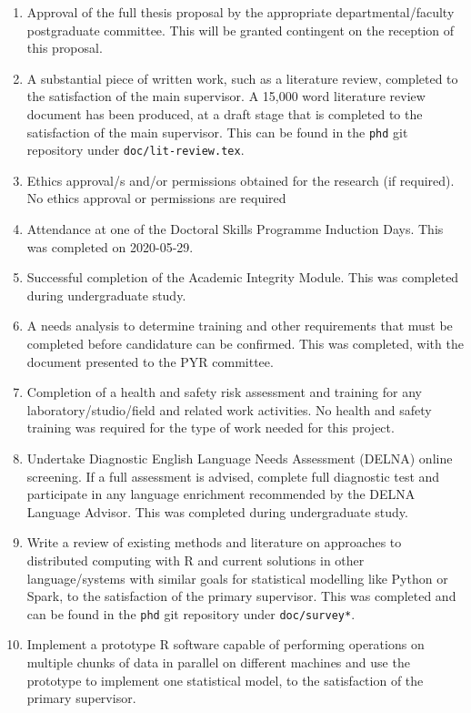 \documentclass[a4paper,10pt]{article}
\begin{document}
\begin{enumerate}
	\item Approval of the full thesis proposal by the appropriate departmental/faculty postgraduate committee.
		This will be granted contingent on the reception of this proposal.
	\item A substantial piece of written work, such as a literature review, completed to the satisfaction of the main supervisor.
		A 15,000 word literature review document has been produced, at a draft stage that is completed to the satisfaction of the main supervisor. 
		This can be found in the \texttt{phd} git repository under \texttt{doc/lit-review.tex}.
	\item Ethics approval/s and/or permissions obtained for the research (if required). 
		No ethics approval or permissions are required
	\item Attendance at one of the Doctoral Skills Programme Induction Days.
		This was completed on 2020-05-29.
	\item Successful completion of the Academic Integrity Module.
		This was completed during undergraduate study.
	\item A needs analysis to determine training and other requirements that must be completed before candidature can be confirmed.
		This was completed, with the document presented to the PYR committee.
	\item Completion of a health and safety risk assessment and training for any laboratory/studio/field and related work activities.
		No health and safety training was required for the type of work needed for this project.
	\item Undertake Diagnostic English Language Needs Assessment (DELNA) online screening. 
		If a full assessment is advised, complete full diagnostic test and participate in any language enrichment recommended by the DELNA Language Advisor.
		This was completed during undergraduate study.
	\item Write a review of existing methods and literature on approaches to distributed computing with R and current solutions in other language/systems with similar goals for statistical modelling like Python or Spark, to the satisfaction of the primary supervisor. 
		This was completed and can be found in the \texttt{phd} git repository under \texttt{doc/survey*}.
	\item Implement a prototype R software capable of performing operations on multiple chunks of data in parallel on different machines and use the prototype to implement one statistical model, to the satisfaction of the primary supervisor.

\end{enumerate}
\end{document}
